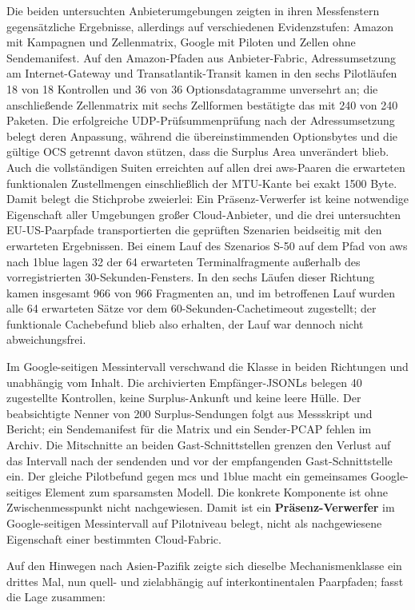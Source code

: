Die beiden untersuchten Anbieterumgebungen zeigten in ihren Messfenstern gegensätzliche Ergebnisse,
allerdings auf verschiedenen Evidenzstufen: Amazon mit Kampagnen und Zellenmatrix, Google mit Piloten und
Zellen ohne Sendemanifest. Auf den Amazon-Pfaden aus Anbieter-Fabric, Adressumsetzung am Internet-Gateway
und Transatlantik-Transit kamen in den sechs Pilotläufen 18 von 18 Kontrollen und 36 von 36
Optionsdatagramme unversehrt an; die anschließende Zellenmatrix mit
sechs Zellformen bestätigte das mit 240 von 240 Paketen. Die erfolgreiche UDP-Prüfsummenprüfung nach
der Adressumsetzung belegt deren Anpassung, während die übereinstimmenden Optionsbytes und die gültige
OCS getrennt davon stützen, dass die Surplus Area unverändert blieb. Auch die vollständigen Suiten
erreichten auf allen drei aws-Paaren die erwarteten funktionalen Zustellmengen einschließlich der
MTU-Kante bei exakt 1500 Byte. Damit belegt die Stichprobe zweierlei: Ein Präsenz-Verwerfer ist keine
notwendige Eigenschaft aller Umgebungen großer Cloud-Anbieter, und die drei untersuchten EU-US-Paarpfade
transportierten die geprüften Szenarien beidseitig mit den erwarteten Ergebnissen. Bei einem
Lauf des Szenarios S-50 auf dem Pfad von aws nach 1blue lagen 32 der 64 erwarteten Terminalfragmente
außerhalb des vorregistrierten 30-Sekunden-Fensters. In den sechs Läufen dieser Richtung kamen
insgesamt 966 von 966 Fragmenten an, und im betroffenen Lauf wurden alle 64 erwarteten Sätze vor dem
60-Sekunden-Cachetimeout zugestellt; der funktionale Cachebefund blieb also erhalten, der Lauf war
dennoch nicht abweichungsfrei.

Im Google-seitigen Mess\-intervall verschwand die Klasse in beiden Richtungen und unabhängig vom Inhalt. Die
archivierten Empfänger-JSONLs belegen 40 zugestellte Kontrollen, keine Surplus-Ankunft und keine leere Hülle. Der
beabsichtigte Nenner von 200 Surplus-Sendungen folgt aus Messskript und Bericht; ein Sendemanifest für die Matrix und
ein Sender-PCAP fehlen im Archiv. Die Mitschnitte an beiden Gast-Schnittstellen grenzen den Verlust auf das Intervall
nach der sendenden und vor der empfangenden Gast-Schnittstelle ein. Der gleiche Pilotbefund gegen mcs und 1blue macht
ein gemeinsames Google-seitiges Element zum sparsamsten Modell. Die konkrete Komponente ist ohne Zwischenmesspunkt nicht
nachgewiesen. Damit ist ein \textbf{Präsenz-Verwerfer} im Google-seitigen Mess\-intervall auf Pilotniveau belegt, nicht
als nachgewiesene Eigenschaft einer bestimmten Cloud-Fabric.

Auf den Hinwegen nach Asien-Pazifik zeigte sich dieselbe Mechanismenklasse ein drittes Mal, nun
quell- und ziel\-abhängig auf interkontinentalen Paarpfaden;  fasst die Lage
zusammen:

